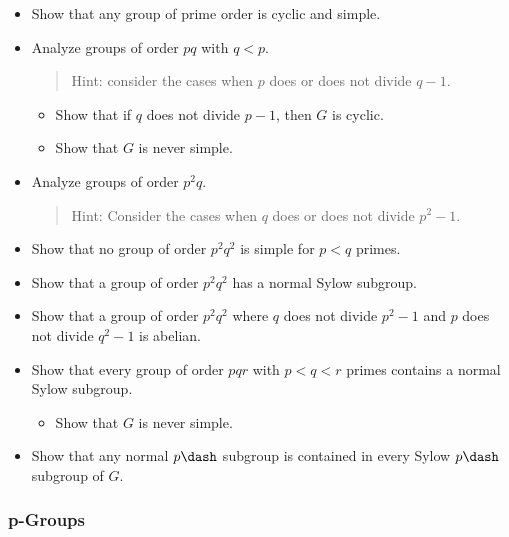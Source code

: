 \begin{itemize}
\item
  Show that any group of prime order is cyclic and simple.
\item
  Analyze groups of order \(pq\) with \(q<p\).

  \begin{quote}
  Hint: consider the cases when \(p\) does or does not divide \(q-1\).
  \end{quote}

  \begin{itemize}
  \tightlist
  \item
    Show that if \(q\) does not divide \(p-1\), then \(G\) is cyclic.
  \item
    Show that \(G\) is never simple.
  \end{itemize}
\item
  Analyze groups of order \(p^2 q\).

  \begin{quote}
  Hint: Consider the cases when \(q\) does or does not divide
  \(p^2 - 1\).
  \end{quote}
\item
  Show that no group of order \(p^2 q^2\) is simple for \(p<q\) primes.
\item
  Show that a group of order \(p^2 q^2\) has a normal Sylow subgroup.
\item
  Show that a group of order \(p^2 q^2\) where \(q\) does not divide
  \(p^2-1\) and \(p\) does not divide \(q^2-1\) is abelian.
\item
  Show that every group of order \(pqr\) with \(p<q<r\) primes contains
  a normal Sylow subgroup.

  \begin{itemize}
  \tightlist
  \item
    Show that \(G\) is never simple.
  \end{itemize}
\item
  Show that any normal \(p\dash\) subgroup is contained in every Sylow
  \(p\dash\)subgroup of \(G\).
\end{itemize}

\hypertarget{p-groups}{%
\subsubsection{p-Groups}\label{p-groups}}

